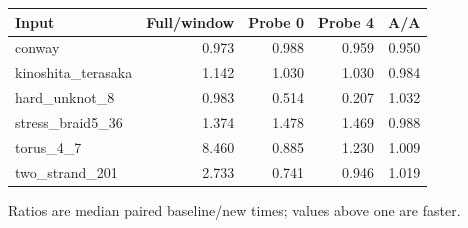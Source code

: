 \begin{center}
\begin{tabular}{@{}lrrrr@{}}
\toprule
Input & Full/window & Probe 0 & Probe 4 & A/A \\
\midrule
conway & 0.973 & 0.988 & 0.959 & 0.950 \\
kinoshita\_terasaka & 1.142 & 1.030 & 1.030 & 0.984 \\
hard\_unknot\_8 & 0.983 & 0.514 & 0.207 & 1.032 \\
stress\_braid5\_36 & 1.374 & 1.478 & 1.469 & 0.988 \\
torus\_4\_7 & 8.460 & 0.885 & 1.230 & 1.009 \\
two\_strand\_201 & 2.733 & 0.741 & 0.946 & 1.019 \\
\bottomrule
\end{tabular}
\end{center}
Ratios are median paired baseline/new times; values above one are faster.

